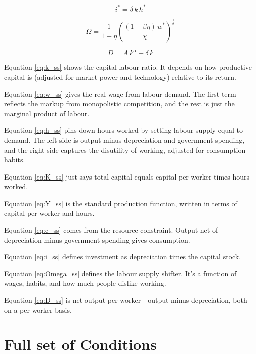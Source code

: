 \documentclass[11pt,preprint]{elsarticle}
\numberwithin{equation}{section}
\numberwithin{figure}{section}
\numberwithin{table}{section}
\begin{document}
\begin{equation}\label{eq:i_ss}
i^* = \delta\,k\,h^*
\end{equation}

\begin{equation}\label{eq:Omega_ss}
\Omega = \frac{1}{1-\eta}
         \left(\frac{(1-\beta\eta)\,w^*}{\chi}\right)^{\!\frac{1}{\theta}}
\end{equation}

\begin{equation}\label{eq:D_ss}
D = A\,k^\alpha - \delta\,k
\end{equation}

Equation \eqref{eq:k_ss} shows the capital-labour ratio. It depends on
how productive capital is (adjusted for market power and technology)
relative to its return.

Equation \eqref{eq:w_ss} gives the real wage from labour demand. The
first term reflects the markup from monopolistic competition, and the
rest is just the marginal product of labour.

Equation \eqref{eq:h_ss} pins down hours worked by setting labour supply
equal to demand. The left side is output minus depreciation and
government spending, and the right side captures the disutility of
working, adjusted for consumption habits.

Equation \eqref{eq:K_ss} just says total capital equals capital per
worker times hours worked.

Equation \eqref{eq:Y_ss} is the standard production function, written in
terms of capital per worker and hours.

Equation \eqref{eq:c_ss} comes from the resource constraint. Output net
of depreciation minus government spending gives consumption.

Equation \eqref{eq:i_ss} defines investment as depreciation times the
capital stock.

Equation \eqref{eq:Omega_ss} defines the labour supply shifter. It's a
function of wages, habits, and how much people dislike working.

Equation \eqref{eq:D_ss} is net output per worker---output minus
depreciation, both on a per-worker basis.

\newpage

\section{Full set of Conditions}\label{full-set-of-conditions}
\end{document}
